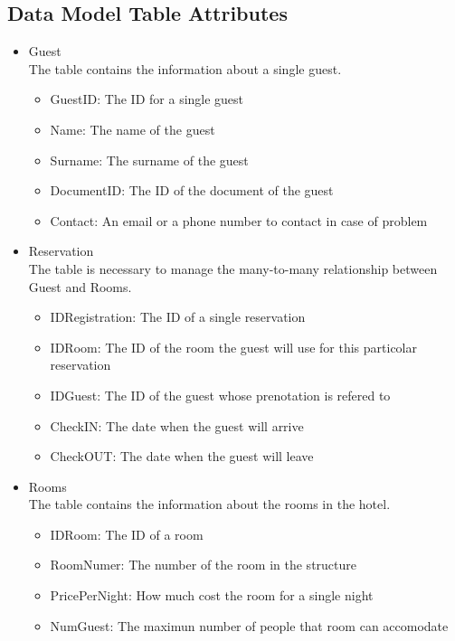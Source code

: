

\subsection{Data Model Table Attributes}

\begin{itemize}
  \item Guest \\ 
    The table contains the information about a single guest.
    \begin{itemize}
      \item GuestID: The ID for a single guest
      \item Name: The name of the guest
      \item Surname: The surname of the guest
      \item DocumentID: The ID of the document of the guest
      \item Contact: An email or a phone number to contact in case of problem
    \end{itemize}
  \item Reservation \\
    The table is necessary to manage the many-to-many relationship between Guest and Rooms.
    \begin{itemize}
      \item IDRegistration: The ID of a single reservation
      \item IDRoom: The ID of the room the guest will use for this particolar reservation
      \item IDGuest: The ID of the guest whose prenotation is refered to
      \item CheckIN: The date when the guest will arrive
      \item CheckOUT: The date when the guest will leave
    \end{itemize}    
  \item Rooms \\
    The table contains the information about the rooms in the hotel.
    \begin{itemize}
      \item IDRoom: The ID of a room
      \item RoomNumer: The number of the room in the structure
      \item PricePerNight: How much cost the room for a single night  
      \item NumGuest: The maximun number of people that room can accomodate

\end{itemize}
\end{itemize}
